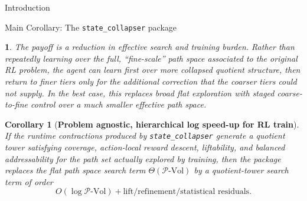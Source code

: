 \documentclass[11pt]{article}
\newtheorem{ermark}[subsubsection]{}
\newtheorem{corollary}[subsubsection]{Corollary}
\newcommand{\PVol}{\mathcal{P}\text{-}\mathrm{Vol}}
\begin{document}
\begin{section}{Introduction}
\begin{subsection}{Main Corollary: The \texttt{state\_collapser} package}
\begin{ermark}
The payoff is a reduction in effective search and training burden. Rather than repeatedly learning over the full, ``fine-scale'' path space associated to the original RL problem, the agent can learn first over more collapsed quotient structure, then return to finer tiers only for the additional correction that the coarser tiers could not supply. In the best case, this replaces broad flat exploration with staged coarse-to-fine control over a much smaller effective path space.
\end{ermark}

\begin{corollary}[{\bf Problem agnostic, hierarchical log speed-up for RL train}]\label{cor:state-collapser}
If the runtime contractions produced by \texttt{state\_collapser} generate a quotient tower satisfying coverage, action-local reward descent, liftability, and balanced addressability for the path set actually explored by training, then the package replaces the flat path space search term \(\Theta(\PVol)\) by a quotient-tower search term of order
\[
    O(\log \PVol)+\text{lift/refinement/statistical residuals}.
\]
\end{corollary}

\end{subsection}

\end{section}
\end{document}
